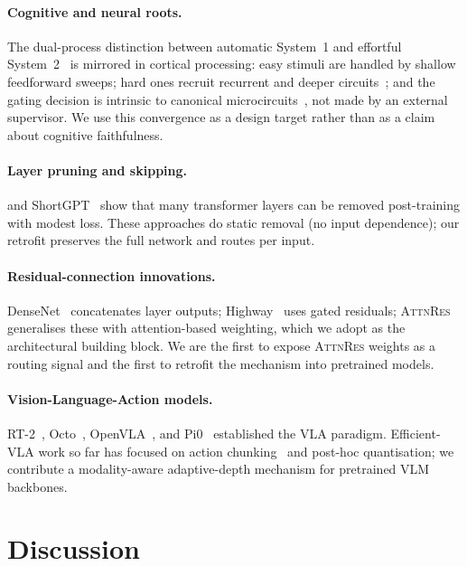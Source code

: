 \documentclass{article}
\newcommand{\attnres}{\textsc{AttnRes}}
\begin{document}
\paragraph{Cognitive and neural roots.}
The dual-process distinction between automatic System~1 and effortful System~2~\citep{kahneman2011thinking} is mirrored in cortical processing: easy stimuli are handled by shallow feedforward sweeps; hard ones recruit recurrent and deeper circuits~\citep{lamme2000distinct, kar2019recurrent, dicarlo2012does}; and the gating decision is intrinsic to canonical microcircuits~\citep{bastos2012canonical, buschman2007topdown}, not made by an external supervisor. We use this convergence as a design target rather than as a claim about cognitive faithfulness.

\paragraph{Layer pruning and skipping.}
\citet{gromov2024unreasonable} and ShortGPT~\citep{men2024shortgpt} show that many transformer layers can be removed post-training with modest loss. These approaches do static removal (no input dependence); our retrofit preserves the full network and routes per input.

\paragraph{Residual-connection innovations.}
DenseNet~\citep{huang2017densely} concatenates layer outputs; Highway~\citep{srivastava2015highway} uses gated residuals; \attnres{}~\citep{chen2026attnres} generalises these with attention-based weighting, which we adopt as the architectural building block. We are the first to expose \attnres{} weights as a routing signal and the first to retrofit the mechanism into pretrained models.

\paragraph{Vision-Language-Action models.}
RT-2~\citep{brohan2023rt}, Octo~\citep{team2024octo}, OpenVLA~\citep{kim2024openvla}, and Pi0~\citep{black2024pi0} established the VLA paradigm. Efficient-VLA work so far has focused on action chunking~\citep{zhao2023learning} and post-hoc quantisation; we contribute a modality-aware adaptive-depth mechanism for pretrained VLM backbones.

\section{Discussion}
\label{sec:discussion}
\end{document}
